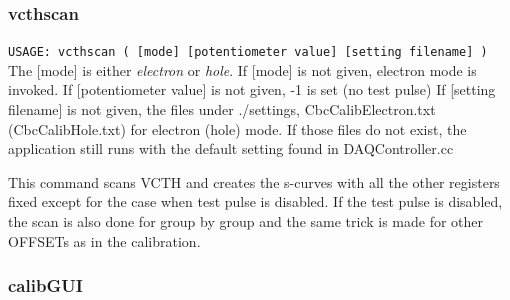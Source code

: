 \documentclass[11pt,a4paper]{article}
\begin{document}
		   \subsubsection{vcthscan}

		   \verb|USAGE: vcthscan ( [mode] [potentiometer value] [setting filename] )|\\
			   The [mode] is either {\it electron} or {\it hole}.
	If [mode] is not given, electron mode is invoked. 
If [potentiometer value] is not given, -1 is set (no test pulse)
	If [setting filename] is not given, 
	the files under ./settings, CbcCalibElectron.txt (CbcCalibHole.txt) for electron (hole) mode.
	If those files do not exist, the application still runs with the default setting found in DAQController.cc

	This command scans VCTH and creates the s-curves with all the other registers fixed except for the case when test pulse is disabled. 
	If the test pulse is disabled, the scan is also done for group by group and the same trick is made for other OFFSETs as in the calibration. 

	\subsubsection{calibGUI}
\end{document}
